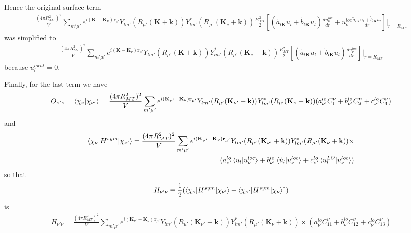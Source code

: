 \documentclass[aps,prb,floatfix,epsfig,singlecolumn,showpacs,preprintnumbers]{revtex4}
\renewcommand{\vr}{{\mathbf{r}}}
\newcommand{\vk}{{\mathbf{k}}}
\newcommand{\vK}{{\mathbf{K}}}
\begin{document}
Hence the original surface term
\begin{eqnarray}
\frac{(4\pi  R_{MT}^2)^2}{V}\sum_{m'\mu'} e^{i(\vK-\vK_\nu)\vr_{\mu'}}
Y_{lm'}(R_{\mu'}(\vK+\vk)) Y^*_{lm'}(R_{\mu'}(\vK_\nu+\vk))
\frac{R_{MT}^2 }{2}   
\left[(\tilde{a}_{l\vK} u_l + \tilde{b}_{l\vK} \dot{u}_l) \frac{du_\nu^{loc}}{dr}+
u_\nu^{loc} \frac{\tilde{a}_{l\vK} u_l + \tilde{b}_{l\vK} \dot{u}_l}{dr}\right]\biggl|_{r=R_{MT}}
\nonumber
\end{eqnarray}
was simplified to
\begin{eqnarray}
\frac{(4\pi  R_{MT}^2)^2}{V}\sum_{m'\mu'} e^{i(\vK-\vK_\nu)\vr_{\mu'}}
Y_{lm'}(R_{\mu'}(\vK+\vk)) Y^*_{lm'}(R_{\mu'}(\vK_\nu+\vk))  
\frac{R_{MT}^2 }{2}  
\left[(\tilde{a}_{l\vK} u_l + \tilde{b}_{l\vK} \dot{u}_l) \frac{du_\nu^{loc}}{dr}\right]\biggl|_{r=R_{MT}}
\nonumber
\end{eqnarray}
because $u^{local}_l=0$.

Finally, for the last term we have
\begin{eqnarray}
O_{\nu'\nu}=\braket{\chi_\nu|\chi_{\nu'}}=
\frac{(4\pi  R_{MT}^2)^2}{V}\sum_{m'\mu'} e^{i(\vK_{\nu'}-\vK_\nu)\vr_{\mu'}}Y_{lm'}(R_{\mu'}(\vK_{\nu'}+\vk)) Y^*_{lm'}(R_{\mu'}(\vK_\nu+\vk))
(a^{lo}_{\nu'} C_1^\nu + b^{lo}_{\nu'} C_2^\nu + c^{lo}_{\nu'} C_3^\nu)
\end{eqnarray}
and
\begin{eqnarray}
\braket{\chi_{\nu}|H^{sym}|\chi_{\nu'}}=\frac{(4\pi  R_{MT}^2)^2}{V}\sum_{m'\mu'} e^{i(\vK_{\nu'}-\vK_\nu)\vr_{\mu'}}Y_{lm'}(R_{\mu'}(\vK_{\nu'}+\vk)) Y^*_{lm'}(R_{\mu'}(\vK_\nu+\vk))\times\\
(a^{lo}_{\nu'} \braket{u_l|u_\nu^{loc}} + 
b^{lo}_{\nu'}  \braket{\dot{u}_l|u_\nu^{loc}}  + 
c^{lo}_{\nu'} \braket{u^{LO}_l|u_\nu^{loc}})
\end{eqnarray}
so that
\begin{eqnarray}
H_{\nu'\nu}\equiv \frac{1}{2}(\braket{\chi_{\nu}|H^{sym}|\chi_{\nu'}}+\braket{\chi_{\nu'}|H^{sym}|\chi_{\nu}}^*)
\end{eqnarray}
is
\begin{eqnarray}
H_{\nu'\nu}=\frac{(4\pi  R_{MT}^2)^2}{V}\sum_{m'\mu'} e^{i(\vK_{\nu'}-\vK_\nu)\vr_{\mu'}}Y_{lm'}(R_{\mu'}(\vK_{\nu'}+\vk)) Y^*_{lm'}(R_{\mu'}(\vK_\nu+\vk))\times
(a^{lo}_{\nu'} C_{11}^\nu+
b^{lo}_{\nu'}  C_{12}^\nu+
c^{lo}_{\nu'} C_{13}^\nu)
\end{eqnarray}
\end{document}
